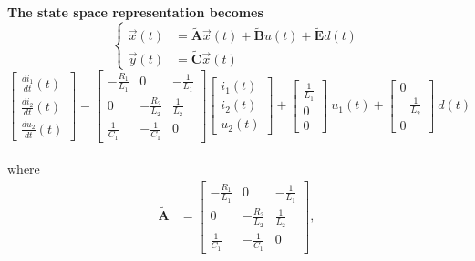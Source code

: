 \documentclass[11pt,a4paper,oneside]{book}
\numberwithin{equation}{section}
\theoremstyle{it}
\theoremstyle{definition}
\begin{document}
\begin{mybox}
	\noindent\textbf{The state space representation becomes}
	\begin{equation*}
		\left\lbrace \begin{aligned}
			\dot{\vec{x}}(t) &= \tilde{\mathbf{A}} \vec{x}(t) + 
			\tilde{\mathbf{B}}u(t) + \tilde{\mathbf{E}}d(t)\\[6pt]
			{\vec{y}}(t) &= \tilde{\mathbf{C}} \vec{x}(t)
		\end{aligned}\right. 
	\end{equation*}
	\begin{equation*}
		\left[ 
		\begin{matrix}
			\frac{di_1}{dt}(t) \\[6pt]
			\frac{di_2}{dt}(t) \\[6pt]
			\frac{du_2}{dt}(t)
		\end{matrix} \right] = \left[ 
		\begin{matrix}
			-\frac{R_1}{L_1} & 0 & -\frac{1}{L_1}\\[6pt]
			0 & -\frac{R_2}{L_2} & \frac{1}{L_2}\\[6pt]
			\frac{1}{C_1} & -\frac{1}{C_1} & 0
		\end{matrix} \right] \left[ 
		\begin{matrix}
			i_1(t) \\[6pt]
			i_2(t)\\[6pt]
			u_2(t)
		\end{matrix} \right] + 
		\left[ 
		\begin{matrix}
			\frac{1}{L_1} \\[6pt]
			0 \\[6pt]
			0
		\end{matrix} \right] \ u_1(t) + 
		\left[ 
		\begin{matrix}
			0 \\[6pt]
			-\frac{1}{L_2} \\[6pt]
			0
		\end{matrix} \right] \ d(t)
	\end{equation*}\\
	where 
	\begin{equation*}
		\begin{aligned}
			\tilde{\mathbf{A}} &= \begin{bmatrix}
				-\frac{R_1}{L_1} & 0 & -\frac{1}{L_1}\\[6pt]
				0 & -\frac{R_2}{L_2} & \frac{1}{L_2}\\[6pt]
				\frac{1}{C_1} & -\frac{1}{C_1} & 0
			\end{bmatrix}, 

\end{aligned}
\end{equation*}
\end{mybox}
\end{document}
